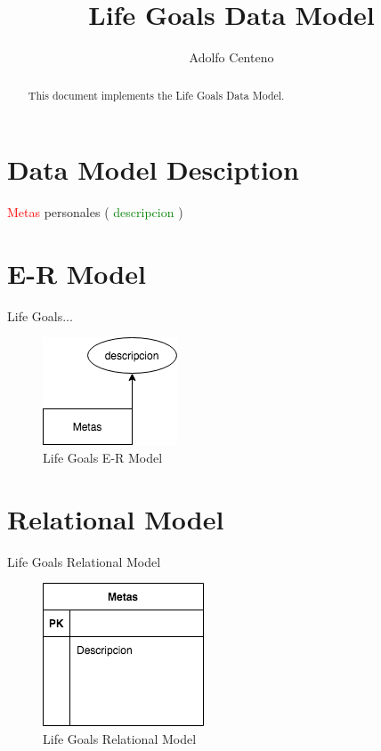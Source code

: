 \documentclass[10pt]{article}         %
\title{Life Goals Data Model}
\author{Adolfo Centeno}
\begin{document}
\maketitle

\begin{abstract}
This document implements the Life Goals Data Model.
\end{abstract}

\section{Data Model Desciption}


\textcolor{red}{Metas} personales ( \textcolor{green}{descripcion} )



\section{E-R Model}

Life Goals...

\begin{figure}[h]
     \includegraphics[scale=0.6]{er_lifegoals}
     \caption{Life Goals E-R Model}
\end{figure}
   
\section{Relational Model}
Life Goals Relational Model

\begin{figure}[h]
     \includegraphics[scale=0.4]{relational_lifegoals}
     \caption{Life Goals Relational Model}
\end{figure}
\end{document}
